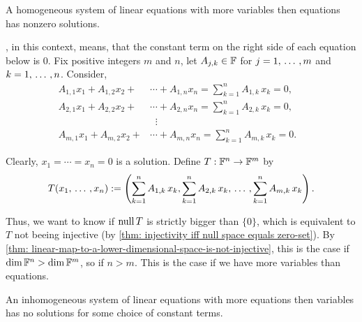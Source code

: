 \begin{thm} 
  A homogeneous system of linear equations with more variables then equations has nonzero solutions.
\end{thm}
\begin{prf} , in this context, means, that the constant term on the right side of each equation below is $0$. Fix positive integers $m$ and $n$, let $A_{j,k} \in \mathbb{F}$ for $j = 1, {\, \ldots \,\,}, m$ and $k = 1, {\, \ldots \,\,}, n$. Consider,
\[
\begin{aligned}
  A_{1,1}x_1 + A_{1,2}x_2 + &\cdots + A_{1,n}x_n = \sum_{k=1}^n A_{1,k}\,x_k = 0,\\
  A_{2,1}x_1 + A_{2,2}x_2 + &\cdots + A_{2,n}x_n = \sum_{k=1}^n A_{2,k}\,x_k = 0,\\
  &\; \; \vdots & \\
  A_{m,1}x_1 + A_{m,2}x_2 + &\cdots + A_{m,n}x_n = \sum_{k=1}^n A_{m,k}\,x_k = 0.
\end{aligned}
\]

Clearly, $x_1 = \cdots = x_n = 0$ is a solution. Define $T: \mathbb{F}^n \to \mathbb{F}^m$ by
\begin{equation}
  T(x_1, {\, \ldots \,\,}, x_n) := \left(\sum_{k=1}^n A_{1,k}\,x_k,\sum_{k=1}^n A_{2,k}\,x_k, {\, \ldots \,\,}, \sum_{k=1}^n A_{m,k}\,x_k \right).
\end{equation}

Thus, we want to know if $\operatorname{null} T$ is strictly bigger than $\{0\}$, which is equivalent to $T$ not beeing injective (by \ref{thm: injectivity iff null space equals zero-set}). By \ref{thm: linear-map-to-a-lower-dimensional-space-is-not-injective}, this is the case if $\dim \mathbb{F}^n > \dim \mathbb{F}^m$, so if $n>m$. This is the case if we have more variables than equations.
\end{prf}

\begin{thm} 
  An inhomogeneous system of linear equations with more equations then variables has no solutions for some choice of constant terms.
\end{thm}


